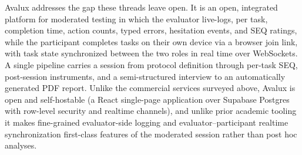 Avalux addresses the gap these threads leave open. It is an open, integrated platform for moderated testing in which the evaluator live-logs, per task, completion time, action counts, typed errors, hesitation events, and SEQ ratings, while the participant completes tasks on their own device via a browser join link, with task state synchronized between the two roles in real time over WebSockets. A single pipeline carries a session from protocol definition through per-task SEQ, post-session instruments, and a semi-structured interview to an automatically generated PDF report. Unlike the commercial services surveyed above, Avalux is open and self-hostable (a React single-page application over Supabase Postgres with row-level security and realtime channels), and unlike prior academic tooling it makes fine-grained evaluator-side logging and evaluator--participant realtime synchronization first-class features of the moderated session rather than post hoc analyses.
